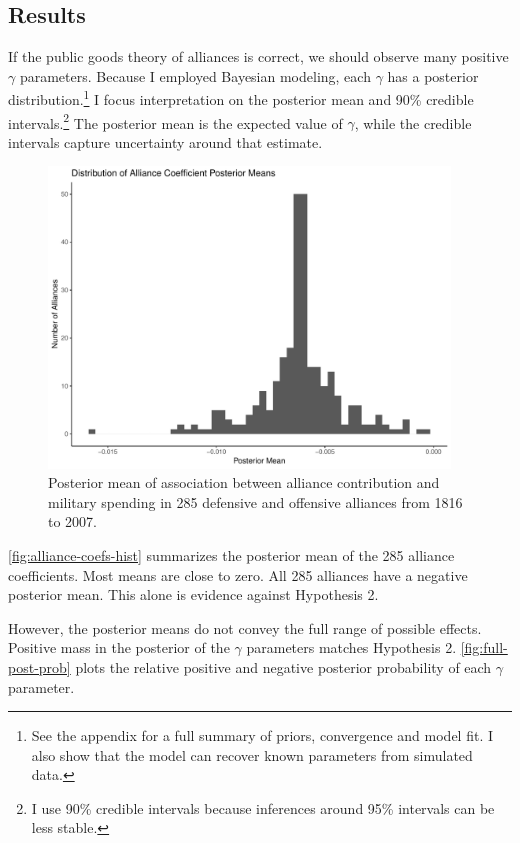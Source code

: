 \documentclass[12pt]{article}
\begin{document}
\subsection{Results} 


If the public goods theory of alliances is correct, we should observe many positive $\gamma$ parameters. 
Because I employed Bayesian modeling, each $\gamma$ has a posterior distribution.\footnote{See the appendix for a full summary of priors, convergence and model fit. I also show that the model can recover known parameters from simulated data.} 
I focus interpretation on the posterior mean and 90\% credible intervals.\footnote{I use 90\% credible intervals because inferences around 95\% intervals can be less stable.}
The posterior mean is the expected value of $\gamma$, while the credible intervals capture uncertainty around that estimate.  


\begin{figure}[htbp]
	\centering
		\includegraphics[width=0.95\textwidth]{alliance-coefs-hist.pdf}
	\caption{Posterior mean of association between alliance contribution and military spending in 285 defensive and offensive alliances from 1816 to 2007.}
	\label{fig:alliance-coefs-hist}
\end{figure}


\autoref{fig:alliance-coefs-hist} summarizes the posterior mean of the 285 alliance coefficients. 
Most means are close to zero. 
All 285 alliances have a negative posterior mean. 
This alone is evidence against Hypothesis 2. 


However, the posterior means do not convey the full range of possible effects. 
Positive mass in the posterior of the $\gamma$ parameters matches Hypothesis 2. 
\autoref{fig:full-post-prob} plots the relative positive and negative posterior probability of each $\gamma$ parameter. 
\end{document}
